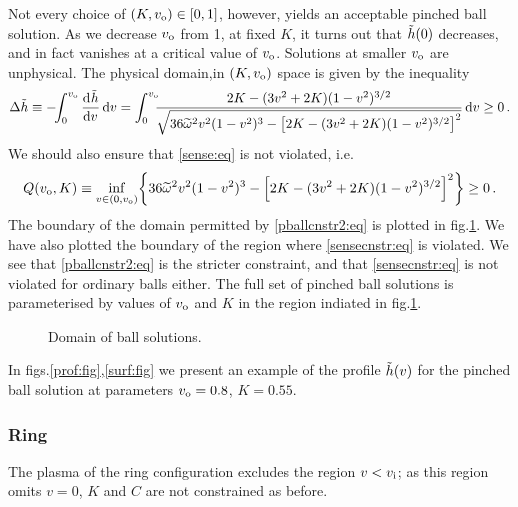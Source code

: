 Not every choice of $(K,v_\mathrm{o})\in[0,1]$, however, yields an acceptable
pinched ball solution. As we decrease $v_\mathrm{o}$ from 1, at fixed $K$, it
turns out that $\tilde h(0)$ decreases, and in fact vanishes at a critical
value of $v_\mathrm{o}$. Solutions at smaller $v_\mathrm{o}$ are unphysical. The
physical domain,in $(K, v_\mathrm{o})$ space is given by the inequality
%
\begin{equation}\label{pballcnstr2:eq}
  \Delta \g \equiv -\!\!\int_0^{\vo} \diff{\g}{v}\,\dr v  =
  \int_0^{\vo}\!\!\!
      \frac{2K-(3v^2+2K)(1-v^2)^{3/2}}
           {\sqrt{36\tw^2v^2(1-v^2)^3-\brk{2K-(3v^2+2K)(1-v^2)^{3/2}}^2}}
      \,\dr v
  \geq 0\,.
\end{equation}
%
We should also ensure that \eqref{sense:eq} is not violated, i.e.
%
\begin{equation}\label{sensecnstr:eq}
  Q(v_\mathrm{o},K) \equiv \inf_{v \in (0,v_\mathrm{o})}\!
    \left\{ 36\widetilde{\omega}^2 v^2(1-v^2)^{3} - \left [ 2K - (3v^2+2K)(1-v^2)^{3/2} \right ]^2 \right\}
    \geq 0\,.
\end{equation}
%
The boundary of the domain permitted by \eqref{pballcnstr2:eq}
is plotted in fig.\ref{pbreg:fig}. We have also plotted the boundary
of the region where \eqref{sensecnstr:eq} is violated. We see that
\eqref{pballcnstr2:eq} is the stricter constraint, and that
\eqref{sensecnstr:eq} is not violated for ordinary balls either. The
full set of pinched ball solutions is parameterised by values of
$v_\mathrm{o}$ and $K$ in the region indiated in fig.\ref{pbreg:fig}.

\begin{figure}[tbh]
%
\begin{center}
  
  \caption{Domain of ball solutions.}\label{pbreg:fig}
\end{center}
%
\end{figure}


In figs.\ref{prof:fig},\ref{surf:fig} we present an example of the profile $\tilde h(v)$
for the pinched ball solution at parameters $v_\mathrm{o}=0.8$, $K=0.55$.


\subsubsection{Ring}\label{sec:ring4d}

The plasma of the ring configuration excludes the region $v<v_\mathrm{i}$; as
this region omits $v=0$,  $K$ and $C$ are not constrained as before.

